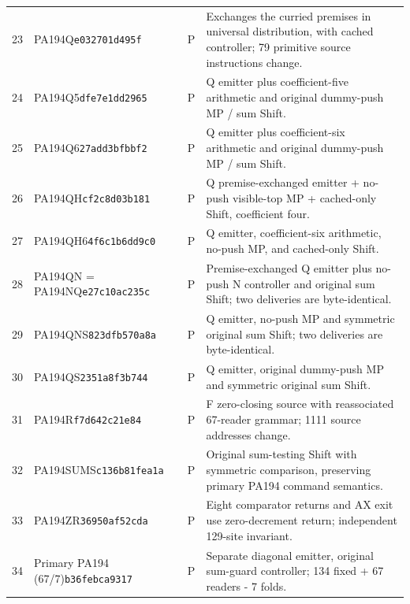 \begin{longtable}{@{}rp{}cp{}@{}}
23 & PA194Q\newline\texttt{e032701d495f} & P & Exchanges the curried premises in universal distribution, with cached controller; 79 primitive source instructions change.\\[5pt]
24 & PA194Q5\newline\texttt{dfe7e1dd2965} & P & Q emitter plus coefficient-five arithmetic and original dummy-push MP / sum Shift.\\[5pt]
25 & PA194Q6\newline\texttt{27add3bfbbf2} & P & Q emitter plus coefficient-six arithmetic and original dummy-push MP / sum Shift.\\[5pt]
26 & PA194QH\newline\texttt{cf2c8d03b181} & P & Q premise-exchanged emitter + no-push visible-top MP + cached-only Shift, coefficient four.\\[5pt]
27 & PA194QH6\newline\texttt{4f6c1b6dd9c0} & P & Q emitter, coefficient-six arithmetic, no-push MP, and cached-only Shift.\\[5pt]
28 & PA194QN = PA194NQ\newline\texttt{e27c10ac235c} & P & Premise-exchanged Q emitter plus no-push N controller and original sum Shift; two deliveries are byte-identical.\\[5pt]
29 & PA194QNS\newline\texttt{823dfb570a8a} & P & Q emitter, no-push MP and symmetric original sum Shift; two deliveries are byte-identical.\\[5pt]
30 & PA194QS\newline\texttt{2351a8f3b744} & P & Q emitter, original dummy-push MP and symmetric original sum Shift.\\[5pt]
31 & PA194R\newline\texttt{f7d642c21e84} & P & F zero-closing source with reassociated 67-reader grammar; 1111 source addresses change.\\[5pt]
32 & PA194SUMS\newline\texttt{c136b81fea1a} & P & Original sum-testing Shift with symmetric comparison, preserving primary PA194 command semantics.\\[5pt]
33 & PA194ZR\newline\texttt{36950af52cda} & P & Eight comparator returns and AX exit use zero-decrement return; independent 129-site invariant.\\[5pt]
34 & Primary PA194 (67/7)\newline\texttt{b36febca9317} & P & Separate diagonal emitter, original sum-guard controller; 134 fixed + 67 readers - 7 folds.\\[5pt]

\end{longtable}
